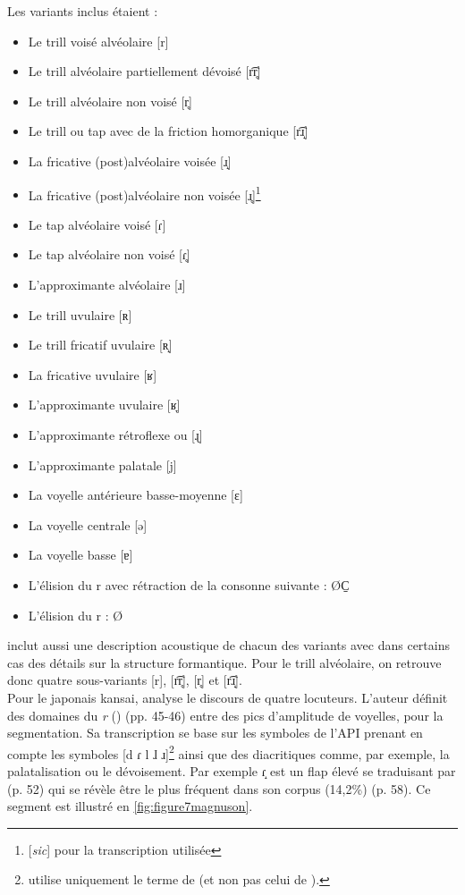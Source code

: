 Les variants inclus étaient :

\begin{itemize}
	\item Le trill voisé alvéolaire [r]
	\item Le trill alvéolaire partiellement dévoisé [r͡r̥]
	\item Le trill alvéolaire non voisé [r̥]
	\item Le trill ou tap avec de la friction homorganique [r͡ɹ̝]
	\item La fricative (post)alvéolaire voisée [ɹ̝]
	\item La fricative (post)alvéolaire non voisée [ɹ̥]\footnote{[\textit{sic}] pour la transcription utilisée}
	\item Le tap alvéolaire voisé [ɾ]
	\item Le tap alvéolaire non voisé [ɾ̥] 
	\item L'approximante alvéolaire [ɹ]
	\item Le trill uvulaire [ʀ]
	\item Le trill fricatif uvulaire [ʀ̝]
	\item La fricative uvulaire [ʁ]
	\item L'approximante uvulaire [ʁ̞]
	\item L'approximante rétroflexe ou  [ɻ]
	\item L'approximante palatale [j]
	\item La voyelle antérieure basse-moyenne [ɛ]
	\item La voyelle centrale [ə]
	\item La voyelle basse [ɐ]
	\item L'élision du r avec rétraction de la consonne suivante : ØC̠
	\item L'élision du r : Ø
\end{itemize}

\citeauthor{sebregtsSociophoneticsPhonologyDutch2014} inclut aussi une description acoustique de chacun des variants avec dans certains cas des détails sur la structure formantique. Pour le trill alvéolaire, on retrouve donc quatre sous-variants [r], [r͡r̥], [r̥] et [r͡ɹ̝]. \\

Pour le japonais kansai, \textcite{magnusonWhatSoundsKansai2008} analyse le discours de quatre locuteurs. L'auteur définit des domaines du \textit{r} () (pp. 45-46) entre des pics d'amplitude de voyelles, pour la segmentation. Sa transcription se base sur les symboles de l'API prenant en compte les symboles [d ɾ l ɺ ɹ]\footnote{\textcite{magnusonWhatSoundsKansai2008} utilise uniquement le terme de  (et non pas celui de ).} ainsi que des diacritiques comme, par exemple, la palatalisation ou le dévoisement. Par exemple ɾ̝ est un flap élevé se traduisant par  (p. 52) qui se révèle être le plus fréquent dans son corpus (14,2\%) (p. 58). Ce segment est illustré en \autoref{fig:figure7magnuson}.\\

